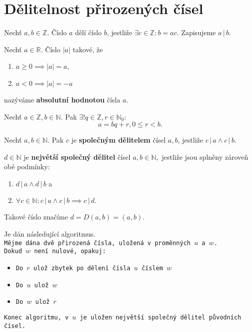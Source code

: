 \section{Dělitelnost přirozených čísel}
\begin{definition}
  Nechť $a,b\in\mathbb Z.$ Číslo $a$ dělí číslo $b$, jestliže $\exists c \in \mathbb Z: b=ac$. Zapisujeme $a\, | \, b$.
\end{definition}

\begin{definition}
  Nechť $a\in \mathbb R$. Číslo $|a|$ takové, že
  \begin{enumerate}[$i.$]
    \item $a\geq 0 \implies |a| = a$,
    \item $a<0 \implies |a| = - a$
  \end{enumerate}
  nazýváme \textbf{absolutní hodnotou} čísla $a$.
\end{definition}

\begin{veta}
  Nechť $a\in \mathbb Z, b\in \mathbb N.$ Pak $\exists ! q \in \mathbb Z, r\in \mathbb N_0:$
  $$a=bq+r, 0 \leq r < b.$$
\end{veta}

\begin{definition}
  Nechť $a,b\in \mathbb N$. Pak $c$ je \textbf{společným dělitelem} čísel $a,b$, jestliže $c \, | \, a \land c\, | \, b.$
\end{definition}

\begin{definition}
  $d\in \mathbb N$ je \textbf{největší společný dělitel} čísel $a,b \in \mathbb N,$ jestliže jsou splněny zároveň obě podmínky:
  \begin{enumerate}[$i.$]
    \item $d\, | \, a \land d \, | \, b$ a
    \item $\forall c \in \mathbb N: c \, | \, a \land c \, | \, b \implies c \, | \, d.$
  \end{enumerate}
  Takové číslo značíme $d=D(a,b)=(a,b).$
\end{definition}

\begin{definition}
  Je dán následující algoritmus.  \\
  \texttt{Mějme dána dvě přirozená čísla, uložená v proměnných $u$ a $w$.} \\
  \texttt{Dokud $w$ není nulové, opakuj:}
  \begin{itemize}
    \item \texttt{Do $r$ ulož zbytek po dělení čísla $u$ číslem $w$}
    \item \texttt{Do $u$ ulož $w$}
    \item \texttt{Do $w$ ulož $r$}
  \end{itemize}
  \texttt{Konec algoritmu, v $u$ je uložen největší společný dělitel původních čísel.}
\end{definition}

